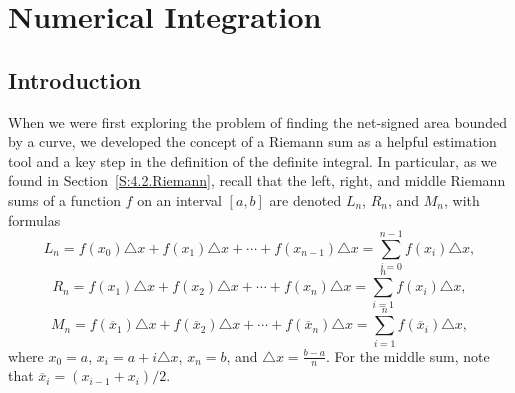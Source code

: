 \section{Numerical Integration} \label{S:5.6.NumInt}

\vspace*{-14 pt}

\subsection*{Introduction}

When we were first exploring the problem of finding the net-signed area bounded by a curve, we developed the concept of a Riemann sum as a helpful estimation tool and a key step in the definition of the definite integral.  In particular, as we found in Section~\ref{S:4.2.Riemann}, recall that the left, right, and middle Riemann sums of a function $f$ on an interval $[a,b]$ are denoted $L_n$, $R_n$, and $M_n$, with formulas
\begin{equation} \label{E:Left}
L_n = f(x_0) \triangle x + f(x_1) \triangle x + \cdots + f(x_{n-1}) \triangle x = \sum_{i = 0}^{n-1} f(x_i) \triangle x,
\end{equation}
\begin{equation} \label{E:Right}R_n = f(x_1) \triangle x + f(x_2) \triangle x + \cdots + f(x_{n}) \triangle x = \sum_{i = 1}^{n} f(x_i) \triangle x,
\end{equation}
\begin{equation} \label{E:Mid}M_n = f(\overline{x}_1) \triangle x + f(\overline{x}_2) \triangle x + \cdots + f(\overline{x}_{n}) \triangle x = \sum_{i = 1}^{n} f(\overline{x}_i) \triangle x,
\end{equation}
where $x_0 = a$, $x_i = a + i\triangle x$, $x_n = b$, and $\triangle x = \frac{b-a}{n}$.  For the middle sum, note that $\overline{x}_{i} = (x_{i-1} + x_i)/2$.  

